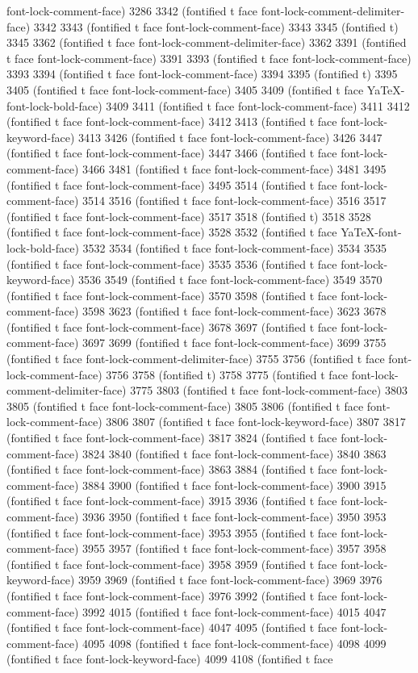 {{font-lock-comment-face) 3286 3342 (fontified t face font-lock-comment-delimiter-face) 3342 3343 (fontified t face font-lock-comment-face) 3343 3345 (fontified t) 3345 3362 (fontified t face font-lock-comment-delimiter-face) 3362 3391 (fontified t face font-lock-comment-face) 3391 3393 (fontified t face font-lock-comment-face) 3393 3394 (fontified t face font-lock-comment-face) 3394 3395 (fontified t) 3395 3405 (fontified t face font-lock-comment-face) 3405 3409 (fontified t face YaTeX-font-lock-bold-face) 3409 3411 (fontified t face font-lock-comment-face) 3411 3412 (fontified t face font-lock-comment-face) 3412 3413 (fontified t face font-lock-keyword-face) 3413 3426 (fontified t face font-lock-comment-face) 3426 3447 (fontified t face font-lock-comment-face) 3447 3466 (fontified t face font-lock-comment-face) 3466 3481 (fontified t face font-lock-comment-face) 3481 3495 (fontified t face font-lock-comment-face) 3495 3514 (fontified t face font-lock-comment-face) 3514 3516 (fontified t face font-lock-comment-face) 3516 3517 (fontified t face font-lock-comment-face) 3517 3518 (fontified t) 3518 3528 (fontified t face font-lock-comment-face) 3528 3532 (fontified t face YaTeX-font-lock-bold-face) 3532 3534 (fontified t face font-lock-comment-face) 3534 3535 (fontified t face font-lock-comment-face) 3535 3536 (fontified t face font-lock-keyword-face) 3536 3549 (fontified t face font-lock-comment-face) 3549 3570 (fontified t face font-lock-comment-face) 3570 3598 (fontified t face font-lock-comment-face) 3598 3623 (fontified t face font-lock-comment-face) 3623 3678 (fontified t face font-lock-comment-face) 3678 3697 (fontified t face font-lock-comment-face) 3697 3699 (fontified t face font-lock-comment-face) 3699 3755 (fontified t face font-lock-comment-delimiter-face) 3755 3756 (fontified t face font-lock-comment-face) 3756 3758 (fontified t) 3758 3775 (fontified t face font-lock-comment-delimiter-face) 3775 3803 (fontified t face font-lock-comment-face) 3803 3805 (fontified t face font-lock-comment-face) 3805 3806 (fontified t face font-lock-comment-face) 3806 3807 (fontified t face font-lock-keyword-face) 3807 3817 (fontified t face font-lock-comment-face) 3817 3824 (fontified t face font-lock-comment-face) 3824 3840 (fontified t face font-lock-comment-face) 3840 3863 (fontified t face font-lock-comment-face) 3863 3884 (fontified t face font-lock-comment-face) 3884 3900 (fontified t face font-lock-comment-face) 3900 3915 (fontified t face font-lock-comment-face) 3915 3936 (fontified t face font-lock-comment-face) 3936 3950 (fontified t face font-lock-comment-face) 3950 3953 (fontified t face font-lock-comment-face) 3953 3955 (fontified t face font-lock-comment-face) 3955 3957 (fontified t face font-lock-comment-face) 3957 3958 (fontified t face font-lock-comment-face) 3958 3959 (fontified t face font-lock-keyword-face) 3959 3969 (fontified t face font-lock-comment-face) 3969 3976 (fontified t face font-lock-comment-face) 3976 3992 (fontified t face font-lock-comment-face) 3992 4015 (fontified t face font-lock-comment-face) 4015 4047 (fontified t face font-lock-comment-face) 4047 4095 (fontified t face font-lock-comment-face) 4095 4098 (fontified t face font-lock-comment-face) 4098 4099 (fontified t face font-lock-keyword-face) 4099 4108 (fontified t face }}
